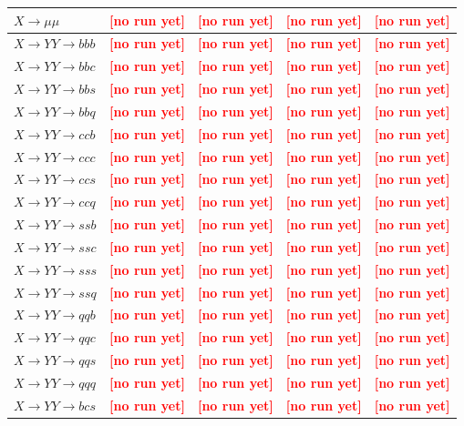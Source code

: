 \documentclass[12pt]{article}   %
\newcommand{\pending}[1]{\textcolor{red}{\textbf{[#1]}}}
\begin{document}
\begin{landscape}
{\begin{longtable}{@{\extracolsep{\fill}}lcccc@{}}
$X\to \mu\mu$ & \pending{no run yet} & \pending{no run yet} & \pending{no run yet} & \pending{no run yet} \\
\midrule
$X\to YY\to bbb$ & \pending{no run yet} & \pending{no run yet} & \pending{no run yet} & \pending{no run yet} \\
$X\to YY\to bbc$ & \pending{no run yet} & \pending{no run yet} & \pending{no run yet} & \pending{no run yet} \\
$X\to YY\to bbs$ & \pending{no run yet} & \pending{no run yet} & \pending{no run yet} & \pending{no run yet} \\
$X\to YY\to bbq$ & \pending{no run yet} & \pending{no run yet} & \pending{no run yet} & \pending{no run yet} \\
$X\to YY\to ccb$ & \pending{no run yet} & \pending{no run yet} & \pending{no run yet} & \pending{no run yet} \\
$X\to YY\to ccc$ & \pending{no run yet} & \pending{no run yet} & \pending{no run yet} & \pending{no run yet} \\
$X\to YY\to ccs$ & \pending{no run yet} & \pending{no run yet} & \pending{no run yet} & \pending{no run yet} \\
$X\to YY\to ccq$ & \pending{no run yet} & \pending{no run yet} & \pending{no run yet} & \pending{no run yet} \\
$X\to YY\to ssb$ & \pending{no run yet} & \pending{no run yet} & \pending{no run yet} & \pending{no run yet} \\
$X\to YY\to ssc$ & \pending{no run yet} & \pending{no run yet} & \pending{no run yet} & \pending{no run yet} \\
$X\to YY\to sss$ & \pending{no run yet} & \pending{no run yet} & \pending{no run yet} & \pending{no run yet} \\
$X\to YY\to ssq$ & \pending{no run yet} & \pending{no run yet} & \pending{no run yet} & \pending{no run yet} \\
$X\to YY\to qqb$ & \pending{no run yet} & \pending{no run yet} & \pending{no run yet} & \pending{no run yet} \\
$X\to YY\to qqc$ & \pending{no run yet} & \pending{no run yet} & \pending{no run yet} & \pending{no run yet} \\
$X\to YY\to qqs$ & \pending{no run yet} & \pending{no run yet} & \pending{no run yet} & \pending{no run yet} \\
$X\to YY\to qqq$ & \pending{no run yet} & \pending{no run yet} & \pending{no run yet} & \pending{no run yet} \\
$X\to YY\to bcs$ & \pending{no run yet} & \pending{no run yet} & \pending{no run yet} & \pending{no run yet} \\

\end{longtable}}
\end{landscape}
\end{document}
